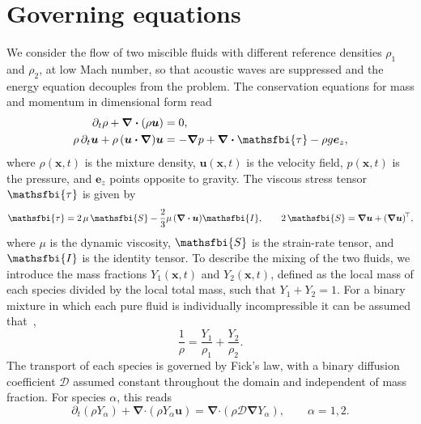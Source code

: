 \documentclass[11pt]{article}
\newcommand{\bnabla}{\boldsymbol{\nabla}}
\newcommand{\bcdot}{\boldsymbol{\cdot}}
\begin{document}
\section{Governing equations}%
\label{sec:governing_equation}
We consider the flow of two miscible fluids with different reference densities \(\rho_1\) and
\(\rho_2\), at low Mach number, so that acoustic waves are suppressed and the energy equation
decouples from the problem. The conservation equations for mass and momentum in
dimensional form read
\begin{subequations}
\begin{align}
    \label{eq:dimensional_continuity}
    \partial_t \rho + \bnabla\bcdot(\rho \boldsymbol{u}) &= 0, \\
    \rho\,\partial_t \boldsymbol{u} + \rho\,(\boldsymbol{u}\bcdot\bnabla)\boldsymbol{u} &= -\bnabla p + \bnabla\bcdot\mathsfbi{\tau} - \rho g \boldsymbol{e}_z,
\end{align}
\end{subequations}
where \(\rho(\boldsymbol{x},t)\) is the mixture density, \(\boldsymbol{u}(\boldsymbol{x},t)\) is the
velocity field, \(p(\boldsymbol{x},t)\) is the pressure, and \(\boldsymbol{e}_z\) points
opposite to gravity. The viscous stress tensor \(\mathsfbi{\tau}\) is given by
\begin{equation}
    \mathsfbi{\tau} =  2\,\mu\,\mathsfbi{S} - \frac{2}{3}\mu\,(\bnabla\bcdot\boldsymbol{u})\mathsfbi{I}, \qquad 2\,\mathsfbi{S} = \bnabla\boldsymbol{u} + (\bnabla\boldsymbol{u})^{\!\top},
\end{equation}
where \(\mu\) is the dynamic viscosity, \(\mathsfbi{S}\) is the strain-rate tensor, and
\(\mathsfbi{I}\) is the identity tensor. To describe the mixing of the two fluids, we introduce the
mass fractions \(Y_1(\boldsymbol{x},t)\) and \(Y_2(\boldsymbol{x},t)\), defined as the local mass
of each species divided by the local total mass, such that \(Y_1 + Y_2 = 1\). For a binary mixture in which each pure fluid is individually incompressible it can be assumed that~\citep{livescu-2020},
\begin{equation}
    \label{eq:specific_volume}
    \frac{1}{\rho} = \frac{Y_1}{\rho_1} + \frac{Y_2}{\rho_2}.
\end{equation}
The transport of each species is governed by Fick's law, with a binary diffusion coefficient \(\mathcal{D}\) assumed constant
throughout the domain and independent of mass fraction. For species \(\alpha\), this reads
\begin{equation}
    \label{eq:species}
    \partial_t (\rho Y_\alpha) + \bnabla\bcdot(\rho Y_\alpha \boldsymbol{u}) = \bnabla\bcdot\left(\rho \mathcal{D} \bnabla Y_\alpha\right), \qquad \alpha = 1,2.
\end{equation}
\end{document}
